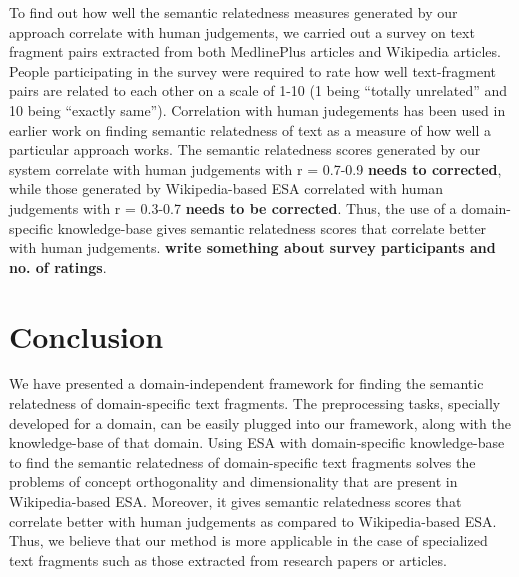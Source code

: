 \documentclass[conference]{IEEEtran}
\begin{document}
To find out how well the semantic relatedness measures generated by our approach correlate with human judgements, we carried out a survey on text fragment pairs extracted from both MedlinePlus articles and Wikipedia articles. People participating in the survey were required to rate how well text-fragment pairs are related to each other on a scale of 1-10 (1 being ``totally unrelated'' and 10 being ``exactly same''). Correlation with human judegements has been used in earlier work on finding semantic relatedness of text as a measure of how well a particular approach works. The semantic relatedness scores generated by our system correlate with human judgements with r = 0.7-0.9 \textbf{needs to corrected}, while those generated by Wikipedia-based ESA correlated with human judgements with r = 0.3-0.7 \textbf{needs to be corrected}. Thus, the use of a domain-specific knowledge-base gives semantic relatedness scores that correlate better with human judgements. \textbf{write something about survey participants and no. of ratings}.

\section{Conclusion}

We have presented a domain-independent framework for finding the semantic relatedness of domain-specific text fragments. The preprocessing tasks, specially developed for a domain, can be easily plugged into our framework, along with the knowledge-base of that domain. Using ESA with domain-specific knowledge-base to find the semantic relatedness of domain-specific text fragments solves the problems of concept orthogonality and dimensionality that are present in Wikipedia-based ESA. Moreover, it gives semantic relatedness scores that correlate better with human judgements as compared to Wikipedia-based ESA. Thus, we believe
\newpage
\noindent that our method is more applicable in the case of specialized text fragments such as those extracted from research papers or articles.
\end{document}
